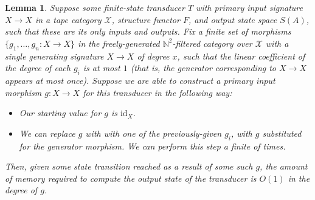 \documentclass{article}
\newtheorem{lemma}[theorem]{Lemma}
\theoremstyle{definition}
\theoremstyle{remark}
\begin{document}
\begin{lemma}
    \label{lem:fsmprepending} Suppose some finite-state transducer
    $T$ with
    primary input signature
    $X\to X$ in a tape category $\mathcal{X}$, structure
    functor $F$, and output state space
    $S(A)$, such that these are its only inputs and outputs.
    Fix a finite set of morphisms $\{g_1,\dots,g_n:X\to X\}$ in
    the freely-generated $\mathbb{N}^2$-filtered category over
    $\mathcal{X}$ with a single generating signature
    $X\to X$ of degree $x$, such that the linear coefficient of
    the degree of each $g_i$ is at most $1$ (that is, the generator
    corresponding to $X\to X$ appears at most once).
    Suppose
    we are able to construct a
    primary input morphism $g:X\to X$
    for this transducer in the following
    way:
    \begin{itemize}
        \item Our starting value for $g$ is $\mathrm{id}_X$.
        \item We can replace $g$ with
        with one of the previously-given $g_i$,
        with $g$ substituted for the
        generator morphism. We can perform this step a finite
        of times.
    \end{itemize}
    Then, given some state transition reached as a result of some
    such $g$,
    the amount of memory required to compute the output state of
    the transducer is $O(1)$ in the degree of $g$.
\end{lemma}
\end{document}
